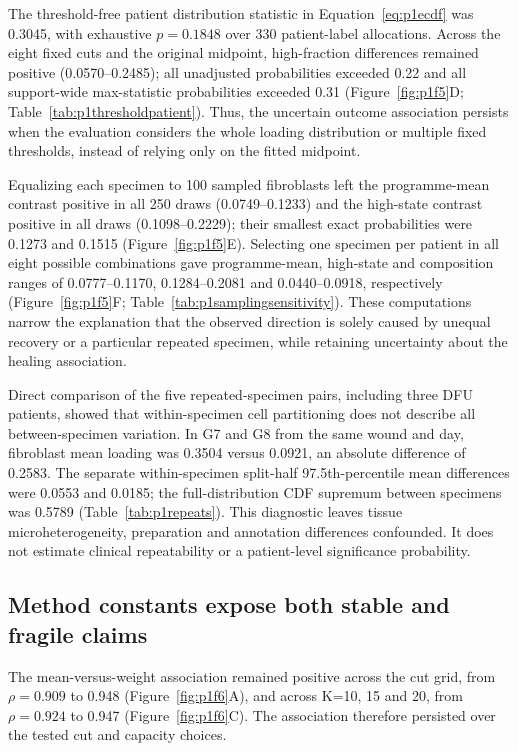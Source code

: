 The threshold-free patient distribution statistic in Equation~\eqref{eq:p1ecdf} was 0.3045, with exhaustive $p=0.1848$ over 330 patient-label allocations. Across the eight fixed cuts and the original midpoint, high-fraction differences remained positive (0.0570--0.2485); all unadjusted probabilities exceeded 0.22 and all support-wide max-statistic probabilities exceeded 0.31 (Figure~\ref{fig:p1f5}D; Table~\ref{tab:p1thresholdpatient}). Thus, the uncertain outcome association persists when the evaluation considers the whole loading distribution or multiple fixed thresholds, instead of relying only on the fitted midpoint.

Equalizing each specimen to 100 sampled fibroblasts left the programme-mean contrast positive in all 250 draws (0.0749--0.1233) and the high-state contrast positive in all draws (0.1098--0.2229); their smallest exact probabilities were 0.1273 and 0.1515 (Figure~\ref{fig:p1f5}E). Selecting one specimen per patient in all eight possible combinations gave programme-mean, high-state and composition ranges of 0.0777--0.1170, 0.1284--0.2081 and 0.0440--0.0918, respectively (Figure~\ref{fig:p1f5}F; Table~\ref{tab:p1samplingsensitivity}). These computations narrow the explanation that the observed direction is solely caused by unequal recovery or a particular repeated specimen, while retaining uncertainty about the healing association.


Direct comparison of the five repeated-specimen pairs, including three DFU patients, showed that within-specimen cell partitioning does not describe all between-specimen variation. In G7 and G8 from the same wound and day, fibroblast mean loading was 0.3504 versus 0.0921, an absolute difference of 0.2583. The separate within-specimen split-half 97.5th-percentile mean differences were 0.0553 and 0.0185; the full-distribution CDF supremum between specimens was 0.5789 (Table~\ref{tab:p1repeats}). This diagnostic leaves tissue microheterogeneity, preparation and annotation differences confounded. It does not estimate clinical repeatability or a patient-level significance probability.

\subsection{Method constants expose both stable and fragile claims}


The mean-versus-weight association remained positive across the cut grid, from $\rho=0.909$ to 0.948 (Figure~\ref{fig:p1f6}A\label{call:p1f6}), and across K=10, 15 and 20, from $\rho=0.924$ to 0.947 (Figure~\ref{fig:p1f6}C). The association therefore persisted over the tested cut and capacity choices.


